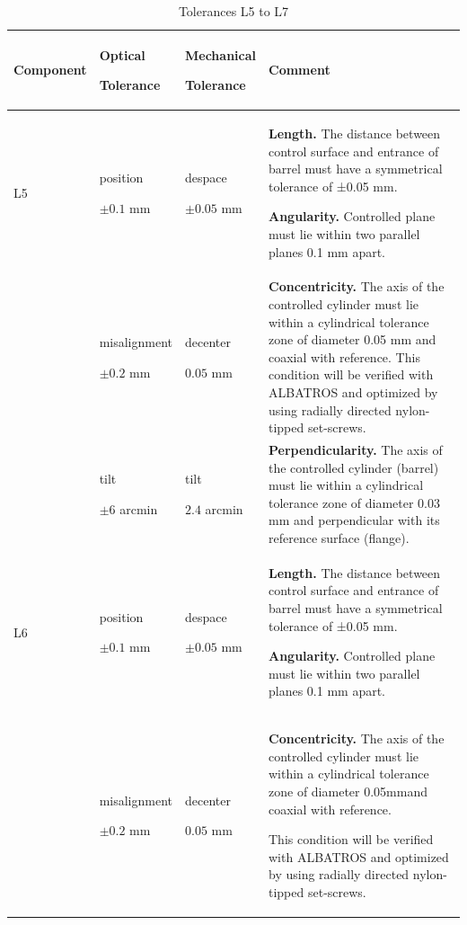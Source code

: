 \documentclass{report}
\begin{document}
\begin{table}
\caption{Tolerances L5 to L7}
\label{table:tol_L5-L7}
\begin{center}
\small
\begin{tabular}{lp{2cm}p{2cm}p{7cm}}
\hline
\hline
Component&Optical\par Tolerance&Mechanical\par Tolerance&Comment\\
\hline
L5	
&position\par$\pm0.1$ mm &despace\par$\pm0.05$ mm&
\textbf{Length.} The distance between control surface and entrance of barrel must have a symmetrical tolerance of ±0.05 mm.\par
\textbf{Angularity.} Controlled plane must lie within two parallel planes 0.1 mm apart.\\
&misalignment\par$\pm0.2$ mm&decenter\par$0.05$ mm&							
\textbf{Concentricity.} The axis of the controlled cylinder must lie within a cylindrical tolerance zone of diameter 0.05 mm and coaxial with reference.
This condition will be verified with ALBATROS and optimized by using radially directed nylon-tipped set-screws.\\
&tilt\par$\pm6$ arcmin&tilt\par$2.4$ arcmin&
\textbf{Perpendicularity.} The axis of the controlled cylinder (barrel) must lie within a cylindrical tolerance zone of diameter 0.03 mm and perpendicular with its reference surface (flange).\\
\hline
L6
&position\par$\pm0.1$ mm&despace\par$\pm0.05$ mm&
\textbf{Length.} The distance between control surface and entrance of barrel must have a symmetrical tolerance of ±0.05 mm.\par
\textbf{Angularity.} Controlled plane must lie within two parallel planes 0.1 mm apart.\\	
&misalignment\par$\pm0.2$ mm&decenter\par$0.05$ mm&
\textbf{Concentricity.} The axis of the controlled cylinder must lie within a cylindrical tolerance zone of diameter 0.05mmand coaxial with reference.\par
This condition will be verified with ALBATROS and optimized by using radially directed nylon-tipped set-screws.\\

\end{tabular}
\end{center}
\end{table}
\end{document}
